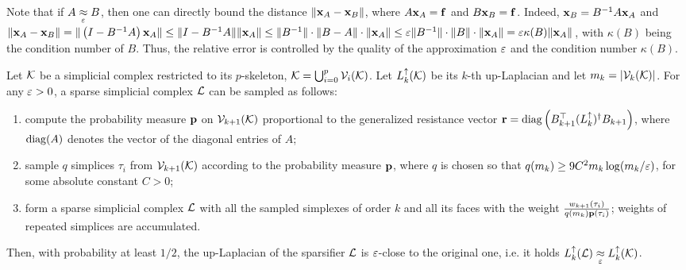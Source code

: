 \documentclass{mynotes}
\begin{document}
\begin{remark}\label{rem:approx_error}
      Note that if \( A \underset{\varepsilon}{\approx} B \), then one can directly bound the distance \( \| \mathbf{x}_A - \mathbf{x}_B \| \), where \( A \mathbf{x}_A = \mathbf{f} \) and \( B \mathbf{x}_B = \mathbf{f}\). Indeed, \( \mathbf{x}_B = B^{-1} A \mathbf{x}_A \) and \(\| \mathbf{x}_A - \mathbf{x}_B \| = \| \left( I - B^{-1}A \right) \mathbf{x}_A \| \le \| I - B^{-1}A \| \| \mathbf{x}_A \| \le  \| B^{-1} \| \cdot \| B - A \| \cdot \| \mathbf{x}_A \| \le \varepsilon \| B^{-1} \| \cdot \| B \| \cdot \| \mathbf{x}_A \| = \varepsilon \kappa(B) \| \mathbf{x}_A \| \), with \( \kappa(B) \) being the condition number of \( B \). Thus, the relative error is controlled by the quality of the approximation \( \varepsilon \) and the condition number \( \kappa(B )\). %
\end{remark}

\begin{thm} \label{thm:sparsify}
      Let \( \mathcal{K} \) be a simplicial complex restricted to its \(p\)-skeleton, \( \mathcal{K} = \bigcup_{i=0}^p \mathcal{V}_{i}(\mathcal{K}) \).  Let   \( L_{k}^{\uparrow} (\mathcal{K} ) \) be its  \(k\)-th up-Laplacian and let \( m_k = | \mathcal{V}_{k}(\mathcal{K}) | \). For any \( \varepsilon > 0 \), a sparse simplicial complex \( \mathcal{L} \) can be sampled as follows:
      \begin{enumerate}[leftmargin=*, label=(\arabic*)]
            \item compute the probability measure \( \mathbf{p}  \) on \( \mathcal{V}_{k+1}(\mathcal{K}) \) proportional to the generalized resistance vector \( \mathbf{r} = \operatorname{diag} \left( B_{k+1}^\top ( L_{k}^{\uparrow} )^\dagger B_{k+1} \right) \), where  $\operatorname{diag}(A)$ denotes the vector of the diagonal entries of $A$;
            \item sample \(q\) simplices \( \tau_i \) from \( \mathcal{V}_{k+1}(\mathcal{K})\) according to the probability measure \( \mathbf{p}  \),  where $q$ is chosen so that  \( q ( m_k ) \ge 9 C^2 m_{k} \log ( m_{k} / \varepsilon  )\), for some absolute constant  \( C>0 \);
            \item form a sparse simplicial complex \( \mathcal{L} \) with all the sampled simplexes of order \( k \) and all its faces with the weight \( \frac{ w_{k+1} (\tau_i) }{ q(m_k) \mathbf{p}(\tau_i)  } \); weights of repeated simplices are accumulated.
      \end{enumerate}
      Then, with probability at least \(1/2\), the up-Laplacian of the sparsifier \( \mathcal{L} \) is \(\varepsilon\)-close to the original one, i.e. it holds \( L_{k}^{\uparrow} (\mathcal{L} ) \underset{\varepsilon}{\approx} L_{k}^{\uparrow} (\mathcal{K}) \).
\end{thm}
\end{document}
